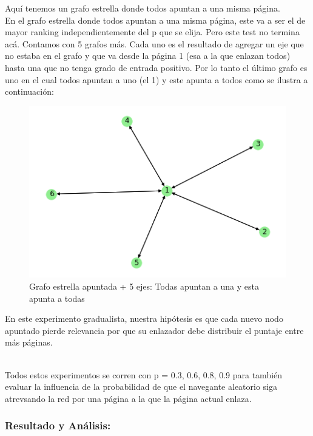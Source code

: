 Aquí tenemos un grafo estrella donde todos apuntan a una misma página. \\

En el grafo estrella donde todos apuntan a una misma página, este va a ser el de mayor ranking independientemente del p que se elija. Pero este test no termina acá. Contamos con 5 grafos más. Cada uno es el resultado de agregar un eje que no estaba en el grafo y que va desde la página 1 (esa a la que enlazan todos) hasta una que no tenga grado de entrada positivo. Por lo tanto el último grafo es uno en el cual todos apuntan a uno (el 1) y este apunta a todos como se ilustra a continuación: \\

\begin{figure}[H]
   \begin{center}
     \includegraphics{img/prueba_estrella_apuntada+5.png} 
  \end{center}
\caption{Grafo estrella apuntada + 5 ejes: Todas apuntan a una y esta apunta a todas} \label{fig:exp3-estrella}
\end{figure}

En este experimento gradualista, nuestra hipótesis es que cada nuevo nodo apuntado pierde relevancia por que su enlazador debe distribuir el puntaje entre más páginas. \\\

Todos estos experimentos se corren con p = 0.3, 0.6, 0.8, 0.9 para también evaluar la influencia de la probabilidad de que el navegante aleatorio siga atrevsando la red por una página a la que la página actual enlaza.

\newpage
\subsubsection{Resultado y Análisis: }

